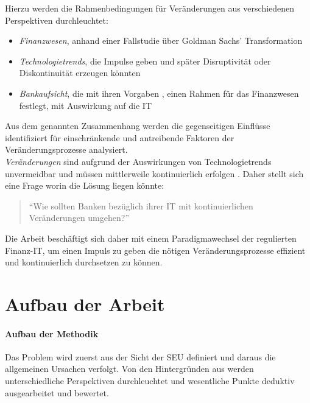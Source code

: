 Hierzu werden die Rahmenbedingungen für Veränderungen aus verschiedenen Perspektiven durchleuchtet:
\begin{itemize}
    \item \emph{Finanzwesen}, anhand einer Fallstudie \cite{Gupta:2017} über Goldman Sachs' Transformation
    \item \emph{Technologietrends}, die Impulse geben und später Disruptivität oder Diskontinuität \cite{Fernandez:2020} erzeugen könnten
    \item \emph{Bankaufsicht}, die mit ihren Vorgaben \cite{MaRisk:2017}, \cite{BAIT:2018} einen Rahmen für das Finanzwesen festlegt, mit Auswirkung auf die IT
\end{itemize}
Aus dem genannten Zusammenhang werden die gegenseitigen Einflüsse identifiziert für einschränkende und antreibende Faktoren der Veränderungsprozesse analysiert. 
\medskip
\\
\emph{Veränderungen} sind aufgrund der Auswirkungen von Technologietrends unvermeidbar und müssen mittlerweile kontinuierlich erfolgen \cite{Bussmann2006, Alt2017, Fernandez:2020}. Daher stellt sich eine Frage worin die Lösung liegen könnte: 
\begin{quote}
    \enquote{Wie sollten Banken bezüglich ihrer IT mit kontinuierlichen Veränderungen umgehen?}
\end{quote}
Die Arbeit beschäftigt sich daher mit einem Paradigmawechsel der regulierten Finanz-IT, um einen Impuls zu geben die nötigen Veränderungsprozesse effizient und kontinuierlich durchsetzen zu können.


%
%
\section{Aufbau der Arbeit}
\label{sec:intro:structure}

\paragraph{Aufbau der Methodik}
Das Problem wird zuerst aus der Sicht der \ac{SEU} definiert und daraus die allgemeinen Ursachen verfolgt. Von den Hintergründen aus werden unterschiedliche Perspektiven durchleuchtet und wesentliche Punkte deduktiv ausgearbeitet und bewertet.

